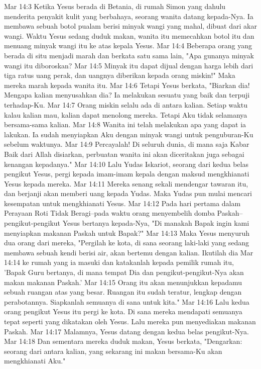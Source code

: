 Mar 14:3  Ketika Yesus berada di Betania, di rumah Simon yang dahulu menderita penyakit kulit yang berbahaya, seorang wanita datang kepada-Nya. Ia membawa sebuah botol pualam berisi minyak wangi yang mahal, dibuat dari akar wangi. Waktu Yesus sedang duduk makan, wanita itu memecahkan botol itu dan menuang minyak wangi itu ke atas kepala Yesus.
Mar 14:4  Beberapa orang yang berada di situ menjadi marah dan berkata satu sama lain, "Apa gunanya minyak wangi itu diboroskan?
Mar 14:5  Minyak itu dapat dijual dengan harga lebih dari tiga ratus uang perak, dan uangnya diberikan kepada orang miskin!" Maka mereka marah kepada wanita itu.
Mar 14:6  Tetapi Yesus berkata, "Biarkan dia! Mengapa kalian menyusahkan dia? Ia melakukan sesuatu yang baik dan terpuji terhadap-Ku.
Mar 14:7  Orang miskin selalu ada di antara kalian. Setiap waktu kalau kalian mau, kalian dapat menolong mereka. Tetapi Aku tidak selamanya bersama-sama kalian.
Mar 14:8  Wanita ini telah melakukan apa yang dapat ia lakukan. Ia sudah menyiapkan Aku dengan minyak wangi untuk penguburan-Ku sebelum waktunya.
Mar 14:9  Percayalah! Di seluruh dunia, di mana saja Kabar Baik dari Allah disiarkan, perbuatan wanita ini akan diceritakan juga sebagai kenangan kepadanya."
Mar 14:10  Lalu Yudas Iskariot, seorang dari kedua belas pengikut Yesus, pergi kepada imam-imam kepala dengan maksud mengkhianati Yesus kepada mereka.
Mar 14:11  Mereka senang sekali mendengar tawaran itu, dan berjanji akan memberi uang kepada Yudas. Maka Yudas pun mulai mencari kesempatan untuk mengkhianati Yesus.
Mar 14:12  Pada hari pertama dalam Perayaan Roti Tidak Beragi--pada waktu orang menyembelih domba Paskah--pengikut-pengikut Yesus bertanya kepada-Nya, "Di manakah Bapak ingin kami menyiapkan makanan Paskah untuk Bapak?"
Mar 14:13  Maka Yesus menyuruh dua orang dari mereka, "Pergilah ke kota, di sana seorang laki-laki yang sedang membawa sebuah kendi berisi air, akan bertemu dengan kalian. Ikutilah dia
Mar 14:14  ke rumah yang ia masuki dan katakanlah kepada pemilik rumah itu, 'Bapak Guru bertanya, di mana tempat Dia dan pengikut-pengikut-Nya akan makan makanan Paskah.'
Mar 14:15  Orang itu akan menunjukkan kepadamu sebuah ruangan atas yang besar. Ruangan itu sudah teratur, lengkap dengan perabotannya. Siapkanlah semuanya di sana untuk kita."
Mar 14:16  Lalu kedua orang pengikut Yesus itu pergi ke kota. Di sana mereka mendapati semuanya tepat seperti yang dikatakan oleh Yesus. Lalu mereka pun menyediakan makanan Paskah.
Mar 14:17  Malamnya, Yesus datang dengan kedua belas pengikut-Nya.
Mar 14:18  Dan sementara mereka duduk makan, Yesus berkata, "Dengarkan: seorang dari antara kalian, yang sekarang ini makan bersama-Ku akan mengkhianati Aku."
